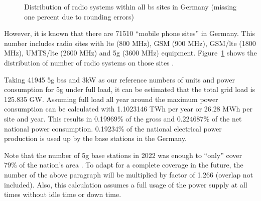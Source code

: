 \documentclass[11pt,a4paper]{article}
\begin{document}
\begin{figure}[h]
  \centering
  \caption{Distribution of radio systems within all \acrlong*{bs} sites in Germany \citep{EMF} (missing one percent due to rounding errors)}
  \label{fig:EMFdistribution}
\end{figure}

However, it is known that there are 71510 \enquote{mobile phone sites} in Germany.
This number includes radio sites with \acrshort{lte} (800 MHz), GSM (900 MHz), GSM/\acrshort{lte} (1800 MHz), UMTS/\acrshort{lte} (2600 MHz) and \acrshort{5g} (3600 MHz) equipment.
Figure~\ref{fig:EMFdistribution} shows the distribution of number of radio systems on those sites \citep{EMF}.

Taking 41945 \acrshort{5g} \acrlong{bs}s and 3kW as our reference numbers of units and power consumption for \acrshort{5g} under full load, it can be estimated that the total grid load is 125.835 GW.
Assuming full load all year around the maximum power consumption can be calculated with 1.1023146 TWh per year or 26.28 MWh per site and year.
This results in 0.19969\% of the gross and 0.224687\% of the net national power consumption.
0.19234\% of the national electrical power production is used up by the base stations in the Germany.

Note that the number of \acrshort{5g} base stations in 2022 was enough to \enquote{only} cover 79\% of the nation's area \citep{5Gausbau}.
To adapt for a complete coverage in the future, the number of the above paragraph will be multiplied by factor of 1.266 (overlap not included).
Also, this calculation assumes a full usage of the power supply at all times without idle time or down time.
\end{document}
